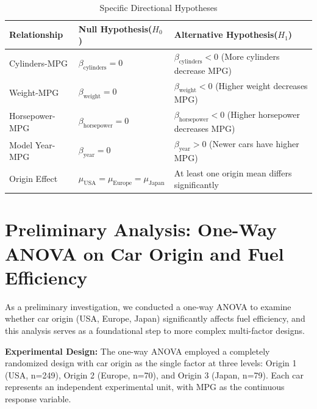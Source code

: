 \documentclass[12pt]{article}
\begin{document}
\begin{table}[!h]
\centering
\caption{Specific Directional Hypotheses}
\label{tab:directional_hypotheses}
\begin{tabular}{p{3cm}p{4.5cm}p{7cm}}
\toprule
\textbf{Relationship} & \textbf{Null Hypothesis($H_0$)} & \textbf{Alternative Hypothesis($H_1$)} \\
\midrule
Cylinders-MPG & $\beta_{\text{cylinders}} = 0$ & $\beta_{\text{cylinders}} < 0$ \newline (More cylinders decrease MPG) \\
\midrule
Weight-MPG & $\beta_{\text{weight}} = 0$ & $\beta_{\text{weight}} < 0$ \newline (Higher weight decreases MPG) \\
\midrule
Horsepower-MPG & $\beta_{\text{horsepower}} = 0$ & $\beta_{\text{horsepower}} < 0$ \newline (Higher horsepower decreases MPG) \\
\midrule
Model Year-MPG & $\beta_{\text{year}} = 0$ & $\beta_{\text{year}} > 0$ \newline (Newer cars have higher MPG) \\
\midrule
Origin Effect & $\mu_{\text{USA}} = \mu_{\text{Europe}} = \mu_{\text{Japan}}$ & At least one origin mean differs significantly \\
\bottomrule
\end{tabular}
\end{table}



\section{{Preliminary Analysis: One-Way ANOVA on Car Origin and Fuel Efficiency}}


As a preliminary investigation, we conducted a one-way ANOVA to examine whether car origin (USA, Europe, Japan) 
significantly affects fuel efficiency, and this analysis serves as a foundational step to more complex multi-factor designs.

\textbf{Experimental Design:} The one-way ANOVA employed a completely randomized design with car origin 
as the single factor at three levels: Origin 1 (USA, n=249), Origin 2 (Europe, n=70), and Origin 3 (Japan, n=79). 
Each car represents an independent experimental unit, with MPG as the continuous response variable.
\end{document}
